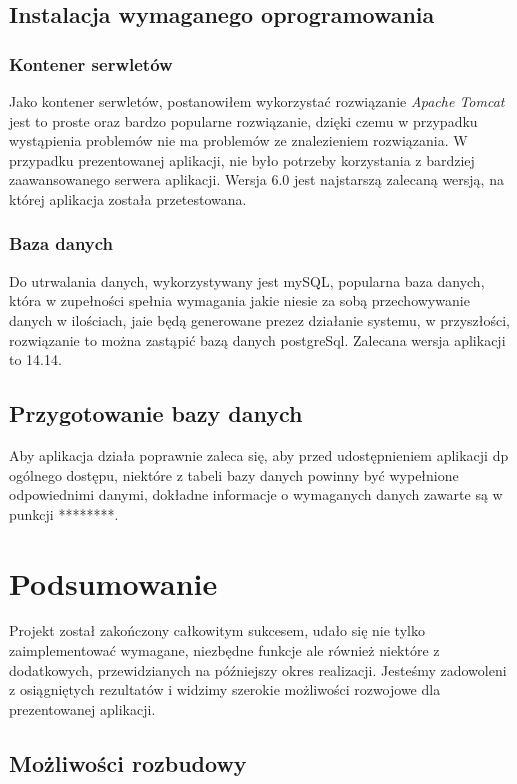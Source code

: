 \documentclass[a4paper, titlepage]{article}
\begin{document}
                \subsection{Instalacja wymaganego oprogramowania}
                \subsubsection{Kontener serwletów}
                Jako kontener serwletów, postanowiłem wykorzystać rozwiązanie \textit{Apache Tomcat} jest to proste oraz bardzo popularne rozwiązanie, dzięki czemu w przypadku wystąpienia problemów nie ma problemów ze znalezieniem rozwiązania. W przypadku prezentowanej aplikacji, nie było potrzeby korzystania z bardziej zaawansowanego serwera aplikacji. Wersja 6.0 jest najstarszą zalecaną wersją, na której aplikacja została przetestowana.
                \subsubsection{Baza danych}
                Do utrwalania danych, wykorzystywany jest mySQL, popularna baza danych, która w zupełności spełnia wymagania jakie niesie za sobą przechowywanie danych w ilościach, jaie będą generowane prezez działanie systemu, w przyszłości, rozwiązanie to można zastąpić bazą danych postgreSql. Zalecana wersja aplikacji to 14.14.
                
			\subsection{Przygotowanie bazy danych}
			Aby aplikacja działa poprawnie zaleca się, aby przed udostępnieniem aplikacji dp ogólnego dostępu, niektóre z tabeli bazy danych powinny być  wypełnione odpowiednimi danymi, dokładne informacje o wymaganych danych zawarte są w punkcji ********. 

\section{Podsumowanie}

Projekt został zakończony całkowitym sukcesem, udało się nie tylko zaimplementować wymagane, niezbędne funkcje ale również niektóre z dodatkowych, przewidzianych na późniejszy okres realizacji. Jesteśmy zadowoleni z osiągniętych rezultatów i widzimy szerokie możliwości rozwojowe dla prezentowanej aplikacji.

\subsection{Możliwości rozbudowy}
\end{document}
